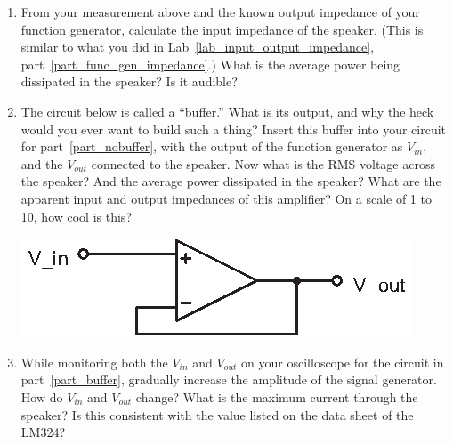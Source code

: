 \begin{enumerate}[wide]
\item From your measurement above and the known output impedance of your function generator, calculate the input impedance of the speaker.  (This is similar to what you did in Lab~\ref{lab_input_output_impedance}, part~\ref{part_func_gen_impedance}.)  What is the average power being dissipated in the speaker?  Is it audible? \label{part_nobuffer}

\item The circuit below is called a ``buffer.'' What is its output, and why the heck would you ever want to build such a thing?  Insert this buffer into your circuit for part~\ref{part_nobuffer}, with the output of the function generator as $V_{in}$, and the $V_{out}$ connected to the speaker.  Now what is the RMS voltage across the speaker?  And the average power dissipated in the speaker?  What are the apparent input and output impedances of this amplifier?  On a scale of 1 to 10, how cool is this? \label{part_buffer}
\begin{center}
\includegraphics{op-amps/buffer.eps}
\end{center}


\item While monitoring both the $V_{in}$ and $V_{out}$ on your oscilloscope for the circuit in part~\ref{part_buffer}, gradually increase the amplitude of the signal generator.  How do $V_{in}$ and $V_{out}$ change?  What is the maximum current through the speaker?  Is this consistent with the value listed on the data sheet of the LM324? 


\end{enumerate}
